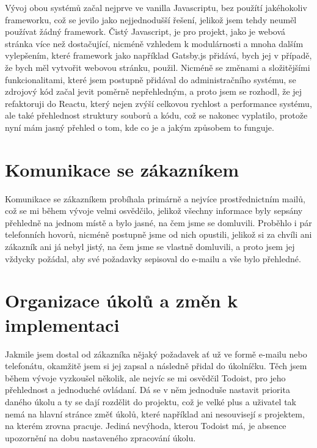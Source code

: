 \documentclass[12pt,a4paper]{report}
\begin{document}
  Vývoj obou systémů začal nejprve ve vanilla Javascriptu, bez použítí jakéhokoliv frameworku, což
  se jevilo jako nejjednodušší řešení, jelikož jsem tehdy neuměl používat žádný framework. Čistý Javascript, je pro projekt, jako je webová stránka více než
  dostačující, nicméně vzhledem k modulárnosti a mnoha dalším vylepšením, které framework jako například Gatsby.js přidává, bych jej v případě, že bych měl vytvořit webovou stránku, použil.
  Nicméně se změnami a složitějšími funkcionalitami, které jsem postupně přidával do administračního systému, se zdrojový kód začal jevit
  poměrně nepřehledným, a proto jsem se rozhodl, že jej refaktoruji do Reactu, který nejen zvýší celkovou rychlost a performance systému, ale také přehlednost struktury souborů a kódu,
  což se nakonec vyplatilo, protože nyní mám jasný přehled o tom, kde co je a jakým způsobem to funguje.

  \section{Komunikace se zákazníkem}
  Komunikace se zákazníkem probíhala primárně a nejvíce prostřednictním mailů,
  což se mi během vývoje velmi osvědčilo, jelikož všechny informace byly sepsány přehledně
  na jednom místě a bylo jasné, na čem jsme se domluvili. Proběhlo i pár telefonních hovorů,
  nicméně postupně jsme od nich opustili, jelikož si za chvíli ani zákazník ani já nebyl jistý, na čem jsme se vlastně domluvili, a proto jsem jej vždycky
  požádal, aby své požadavky sepisoval do e-mailu a vše bylo přehledné.
 
  \section{Organizace úkolů a změn k implementaci}
  Jakmile jsem dostal od zákazníka nějaký požadavek ať už ve formě e-mailu nebo telefonátu, okamžitě jsem si jej 
  zapsal a následně přidal do úkolníčku. Těch jsem během vývoje vyzkoušel několik, ale nejvíc se mi osvědčil 
  Todoist, pro jeho přehlednost a jednoduché ovládaní. Dá se v něm jednoduše nastavit priorita daného úkolu a ty se dají rozdělit
  do projektu, což je velké plus a uživatel tak nemá na hlavní stránce změť úkolů, které například ani nesouvisejí s projektem, na kterém zrovna pracuje.
  Jediná nevýhoda, kterou Todoist má, je absence upozornění na dobu nastaveného zpracování úkolu. 
\end{document}
